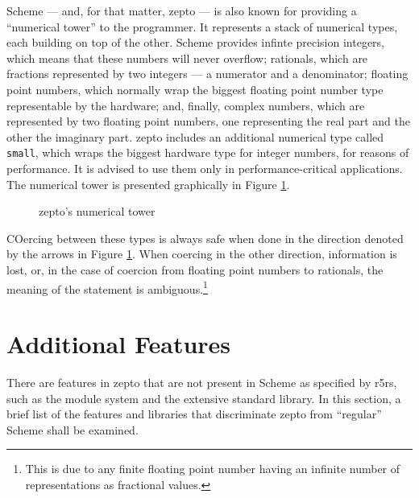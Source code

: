 \documentclass[oneside,11pt,xetex]{scrbook}
\begin{document}
Scheme --- and, for that matter, zepto --- is also known for providing a ``numerical
tower'' to the programmer. It represents a stack of numerical types, each building
on top of the other. Scheme provides infinte precision integers, which means that
these numbers will never overflow; rationals, which are fractions represented by
two integers --- a numerator and a denominator; floating point numbers, which normally
wrap the biggest floating point number type representable by the hardware; and, finally,
complex numbers, which are represented by two floating point numbers, one representing
the real part and the other the imaginary part. zepto includes an additional numerical
type called \texttt{small}, which wraps the biggest hardware type for integer numbers,
for reasons of performance. It is advised to use them only in performance-critical
applications. The numerical tower is presented graphically in Figure \ref{fig:numtower}.

\begin{figure}[H]
\centering
{}
\caption{zepto's numerical tower}
\label{fig:numtower}
\end{figure}

COercing between these types is always safe when done in the direction denoted
by the arrows in Figure \ref{fig:numtower}. When coercing in the other direction, information
is lost, or, in the case of coercion from floating point numbers to rationals, the meaning
of the statement is ambiguous.\footnote{This is due to any finite floating point number
having an infinite number of representations as fractional values.}

\section{Additional Features}

There are features in zepto that are not present in Scheme as specified by \gls{r5rs}, such
as the module system and the extensive standard library. In this section, a brief list of
the features and libraries that discriminate zepto from ``regular'' Scheme shall be examined.
\end{document}
